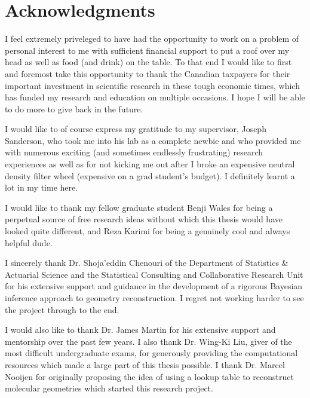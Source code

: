 
\begingroup
\let\clearpage\relax
\let\cleardoublepage\relax
\let\cleardoublepage\relax
\chapter*{Acknowledgments}
I feel extremely priveleged to have had the opportunity to work on a problem of personal interest to me with sufficient financial support to put a roof over my head as well as food (and drink) on the table. To that end I would like to first and foremost take this opportunity to thank the Canadian taxpayers for their important investment in scientific research in these tough economic times, which has funded my research and education on multiple occasions. I hope I will be able to do more to give back in the future.

I would like to of course express my gratitude to my supervisor, Joseph Sanderson, who took me into his lab as a complete newbie and who provided me with numerous exciting (and sometimes endlessly frustrating) research experiences as well as for not kicking me out after I broke an expensive neutral density filter wheel (expensive on a grad student's budget). I definitely learnt a lot in my time here.

I would like to thank my fellow graduate student Benji Wales for being a perpetual source of free research ideas without which this thesis would have looked quite different, and Reza Karimi for being a genuinely cool and always helpful dude.

I sincerely thank Dr. Shoja'eddin Chenouri of the Department of Statistics \& Actuarial Science and the Statistical Consulting and Collaborative Research Unit for his extensive support and guidance in the development of a rigorous Bayesian inference approach to geometry reconstruction. I regret not working harder to see the project through to the end.

I would also like to thank Dr. James Martin for his extensive support and mentorship over the past few years. I also thank Dr. Wing-Ki Liu, giver of the most difficult undergraduate exams, for generously providing the computational resources which made a large part of this thesis possible. I thank Dr. Marcel Nooijen for originally proposing the idea of using a lookup table to reconstruct molecular geometries which started this research project.

